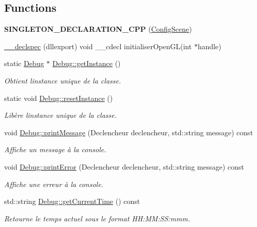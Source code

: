 \subsection*{Functions}
\begin{DoxyCompactItemize}
\item 
\hypertarget{group__inf2990_ga20fe9d4d1e6e509d0718eeb7e75a4e7e}{}{\bfseries S\+I\+N\+G\+L\+E\+T\+O\+N\+\_\+\+D\+E\+C\+L\+A\+R\+A\+T\+I\+O\+N\+\_\+\+C\+P\+P} (\hyperlink{class_config_scene}{Config\+Scene})\label{group__inf2990_ga20fe9d4d1e6e509d0718eeb7e75a4e7e}

\item 
\hyperlink{group__inf2990_gab7f5f39b522334aa53af43ba21a16719}{\+\_\+\+\_\+declspec} (dllexport) void \+\_\+\+\_\+cdecl initialiser\+Open\+G\+L(int $\ast$handle)
\item 
static \hyperlink{class_debug}{Debug} $\ast$ \hyperlink{group__inf2990_ga823bf701dd9f4c706143dca1e8666941}{Debug\+::get\+Instance} ()
\begin{DoxyCompactList}\small\item\em Obtient l\textquotesingle{}instance unique de la classe. \end{DoxyCompactList}\item 
static void \hyperlink{group__inf2990_gacaafb83305279aafab24735adc903931}{Debug\+::reset\+Instance} ()
\begin{DoxyCompactList}\small\item\em Libère l\textquotesingle{}instance unique de la classe. \end{DoxyCompactList}\item 
void \hyperlink{group__inf2990_gace1a61ceaedf36808dc3ba572946eeae}{Debug\+::print\+Message} (Declencheur declencheur, std\+::string message) const 
\begin{DoxyCompactList}\small\item\em Affiche un message à la console. \end{DoxyCompactList}\item 
void \hyperlink{group__inf2990_gaa53736bd47a1b811e8a51f4dc6a0ca71}{Debug\+::print\+Error} (Declencheur declencheur, std\+::string message) const 
\begin{DoxyCompactList}\small\item\em Affiche une erreur à la console. \end{DoxyCompactList}\item 
std\+::string \hyperlink{group__inf2990_ga5477af77bd204e98e7aa142f992b9bd2}{Debug\+::get\+Current\+Time} () const 
\begin{DoxyCompactList}\small\item\em Retourne le temps actuel sous le format H\+H\+:\+M\+M\+:\+S\+S\+:mmm. \end{DoxyCompactList}\item 

\end{DoxyCompactItemize}
